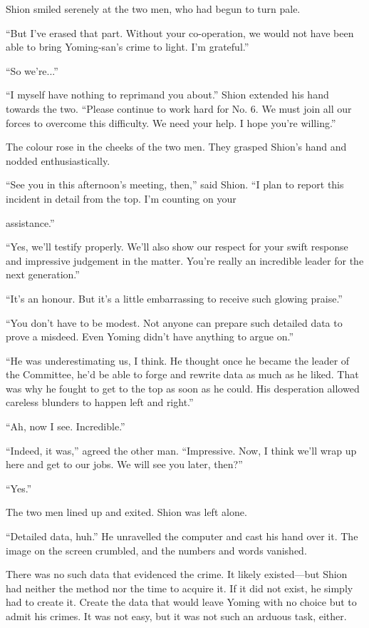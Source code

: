 Shion smiled serenely at the two men, who had begun to turn pale.

``But I've erased that part. Without your co-operation, we would not
have been able to bring Yoming-san's crime to light. I'm grateful.''

``So we're...''

``I myself have nothing to reprimand you about.'' Shion extended his
hand towards the two. ``Please continue to work hard for No. 6. We must
join all our forces to overcome this difficulty. We need your help. I
hope you're willing.''

The colour rose in the cheeks of the two men. They grasped Shion's hand
and nodded enthusiastically.

``See you in this afternoon's meeting, then,'' said Shion. ``I plan to
report this incident in detail from the top. I'm counting on your~

assistance.''

``Yes, we'll testify properly. We'll also show our respect for your
swift response and impressive judgement in the matter. You're really an
incredible leader for the next generation.''

``It's an honour. But it's a little embarrassing to receive such glowing
praise.''

``You don't have to be modest. Not anyone can prepare such detailed data
to prove a misdeed. Even Yoming didn't have anything to argue on.''

``He was underestimating us, I think. He thought once he became the
leader of the Committee, he'd be able to forge and rewrite data as much
as he liked. That was why he fought to get to the top as soon as he
could. His desperation allowed careless blunders to happen left and
right.''

``Ah, now I see. Incredible.''

``Indeed, it was,'' agreed the other man. ``Impressive. Now, I think
we'll wrap up here and get to our jobs. We will see you later, then?''

``Yes.''

The two men lined up and exited. Shion was left alone.

``Detailed data, huh.'' He unravelled the computer and cast his hand
over it. The image on the screen crumbled, and the numbers and words
vanished.

There was no such data that evidenced the crime. It likely existed---but
Shion had neither the method nor the time to acquire it. If it did not
exist, he simply had to create it. Create the data that would leave
Yoming with no choice but to admit his crimes. It was not easy, but it
was not such an arduous task, either.

